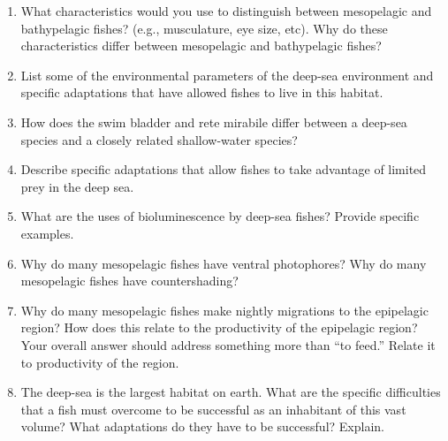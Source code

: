 \documentclass[letterpaper]{tufte-handout}
\begin{document}
\begin{enumerate}
	\item What characteristics would you use to distinguish between mesopelagic and bathypelagic fishes?  (e.g., musculature, eye size, etc).  Why do these characteristics differ between mesopelagic and bathypelagic fishes?

	\item List some of the environmental parameters of the deep-sea environment and specific adaptations that have allowed fishes to live in this habitat.

	\item How does the swim bladder and rete mirabile differ between a deep-sea species and a closely related shallow-water species?

	\item Describe specific adaptations that allow fishes to take advantage of limited prey in the deep sea.

	\item What are the uses of bioluminescence by deep-sea fishes?  Provide specific examples.

	\item Why do many mesopelagic fishes have ventral photophores?  Why do many mesopelagic fishes have countershading?

	\item Why do many mesopelagic fishes make nightly migrations to the epipelagic region?  How does this relate to the productivity of the epipelagic region? Your overall answer should address something more than “to feed.”  Relate it to productivity of the region.  


	\item The deep-sea is the largest habitat on earth.  What are the specific difficulties that a fish must overcome to be successful as an inhabitant of this vast volume?  What adaptations do they have to be successful?  Explain.
	


\end{enumerate}
\end{document}
